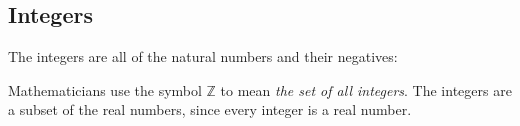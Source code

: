             \subsection{ Integers}
            \nopagebreak
        \label{m38346*id178521}The integers are all of the natural numbers and their negatives:\par 
        \label{m38346*uid57}\nopagebreak\noindent{}
        \label{m38346*id178589}Mathematicians use the symbol $\mathbb{Z}$ to mean \textsl{the set of all
integers}. The integers are a subset of the real numbers, since every integer is
a real number.\par 
      \label{m38346*uid58}
